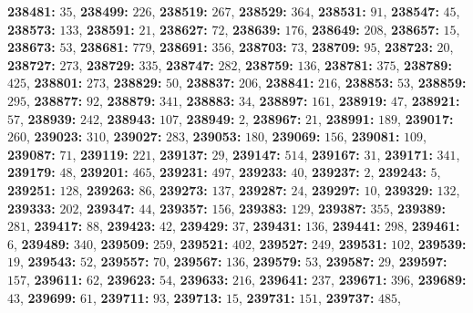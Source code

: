 \textsf{\bfseries 238481:} $35$, \textsf{\bfseries 238499:} $226$, \textsf{\bfseries 238519:} $267$, \textsf{\bfseries 238529:} $364$, \textsf{\bfseries 238531:} $91$, \textsf{\bfseries 238547:} $45$, \textsf{\bfseries 238573:} $133$, \textsf{\bfseries 238591:} $21$, \textsf{\bfseries 238627:} $72$, \textsf{\bfseries 238639:} $176$, \textsf{\bfseries 238649:} $208$, \textsf{\bfseries 238657:} $15$, \textsf{\bfseries 238673:} $53$, \textsf{\bfseries 238681:} $779$, \textsf{\bfseries 238691:} $356$, \textsf{\bfseries 238703:} $73$, \textsf{\bfseries 238709:} $95$, \textsf{\bfseries 238723:} $20$, \textsf{\bfseries 238727:} $273$, \textsf{\bfseries 238729:} $335$, \textsf{\bfseries 238747:} $282$, \textsf{\bfseries 238759:} $136$, \textsf{\bfseries 238781:} $375$, \textsf{\bfseries 238789:} $425$, \textsf{\bfseries 238801:} $273$, \textsf{\bfseries 238829:} $50$, \textsf{\bfseries 238837:} $206$, \textsf{\bfseries 238841:} $216$, \textsf{\bfseries 238853:} $53$, \textsf{\bfseries 238859:} $295$, \textsf{\bfseries 238877:} $92$, \textsf{\bfseries 238879:} $341$, \textsf{\bfseries 238883:} $34$, \textsf{\bfseries 238897:} $161$, \textsf{\bfseries 238919:} $47$, \textsf{\bfseries 238921:} $57$, \textsf{\bfseries 238939:} $242$, \textsf{\bfseries 238943:} $107$, \textsf{\bfseries 238949:} $2$, \textsf{\bfseries 238967:} $21$, \textsf{\bfseries 238991:} $189$, \textsf{\bfseries 239017:} $260$, \textsf{\bfseries 239023:} $310$, \textsf{\bfseries 239027:} $283$, \textsf{\bfseries 239053:} $180$, \textsf{\bfseries 239069:} $156$, \textsf{\bfseries 239081:} $109$, \textsf{\bfseries 239087:} $71$, \textsf{\bfseries 239119:} $221$, \textsf{\bfseries 239137:} $29$, \textsf{\bfseries 239147:} $514$, \textsf{\bfseries 239167:} $31$, \textsf{\bfseries 239171:} $341$, \textsf{\bfseries 239179:} $48$, \textsf{\bfseries 239201:} $465$, \textsf{\bfseries 239231:} $497$, \textsf{\bfseries 239233:} $40$, \textsf{\bfseries 239237:} $2$, \textsf{\bfseries 239243:} $5$, \textsf{\bfseries 239251:} $128$, \textsf{\bfseries 239263:} $86$, \textsf{\bfseries 239273:} $137$, \textsf{\bfseries 239287:} $24$, \textsf{\bfseries 239297:} $10$, \textsf{\bfseries 239329:} $132$, \textsf{\bfseries 239333:} $202$, \textsf{\bfseries 239347:} $44$, \textsf{\bfseries 239357:} $156$, \textsf{\bfseries 239383:} $129$, \textsf{\bfseries 239387:} $355$, \textsf{\bfseries 239389:} $281$, \textsf{\bfseries 239417:} $88$, \textsf{\bfseries 239423:} $42$, \textsf{\bfseries 239429:} $37$, \textsf{\bfseries 239431:} $136$, \textsf{\bfseries 239441:} $298$, \textsf{\bfseries 239461:} $6$, \textsf{\bfseries 239489:} $340$, \textsf{\bfseries 239509:} $259$, \textsf{\bfseries 239521:} $402$, \textsf{\bfseries 239527:} $249$, \textsf{\bfseries 239531:} $102$, \textsf{\bfseries 239539:} $19$, \textsf{\bfseries 239543:} $52$, \textsf{\bfseries 239557:} $70$, \textsf{\bfseries 239567:} $136$, \textsf{\bfseries 239579:} $53$, \textsf{\bfseries 239587:} $29$, \textsf{\bfseries 239597:} $157$, \textsf{\bfseries 239611:} $62$, \textsf{\bfseries 239623:} $54$, \textsf{\bfseries 239633:} $216$, \textsf{\bfseries 239641:} $237$, \textsf{\bfseries 239671:} $396$, \textsf{\bfseries 239689:} $43$, \textsf{\bfseries 239699:} $61$, \textsf{\bfseries 239711:} $93$, \textsf{\bfseries 239713:} $15$, \textsf{\bfseries 239731:} $151$, \textsf{\bfseries 239737:} $485$, 
